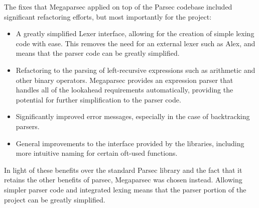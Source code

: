 The fixes that Megaparsec applied on top of the Parsec codebase included significant refactoring efforts, but most importantly for the project:
\begin{itemize}
    \item A greatly simplified Lexer interface, allowing for the creation of simple lexing code with ease.
    This removes the need for an external lexer such as Alex, and means that the parser code can be greatly simplified.
    \item Refactoring to the parsing of left-recursive expressions such as arithmetic and other binary operators. 
    Megaparsec provides an expression parser that handles all of the lookahead requirements automatically, providing the potential for further simplification to the parser code. 
    \item Significantly improved error messages, especially in the case of backtracking parsers. 
    \item General improvements to the interface provided by the libraries, including more intuitive naming for certain oft-used functions.
\end{itemize}

In light of these benefits over the standard Parsec library and the fact that it retains the other benefits of parsec, Megaparsec was chosen instead. 
Allowing simpler parser code and integrated lexing means that the parser portion of the project can be greatly simplified. 




